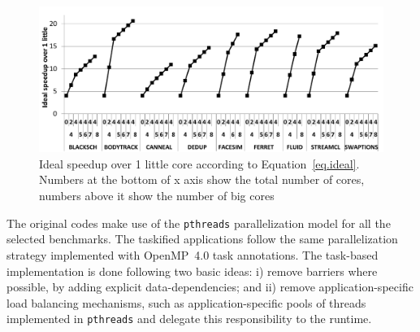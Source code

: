\begin{figure}[t]%
	\centering
	\includegraphics[width=1\columnwidth]{figures/ideal_speedup.pdf}
	\vspace{-0.5cm}
	\caption{Ideal speedup over 1 little core according to Equation~\ref{eq.ideal}. Numbers at the bottom of x axis show the total number of cores, numbers above it show the number of big cores}
	\label{fig:ideal}%
	\vspace{-0.7cm}
\end{figure}

The original codes make use of the \texttt{pthreads} parallelization model for all the selected benchmarks. The taskified applications follow the same parallelization strategy implemented with OpenMP~4.0 task annotations.
The task-based implementation is done following two basic ideas: i) remove barriers where possible, by adding explicit data-dependencies; and ii) remove application-specific load balancing mechanisms, such as application-specific pools of threads implemented in \texttt{pthreads} and delegate this responsibility to the runtime.


